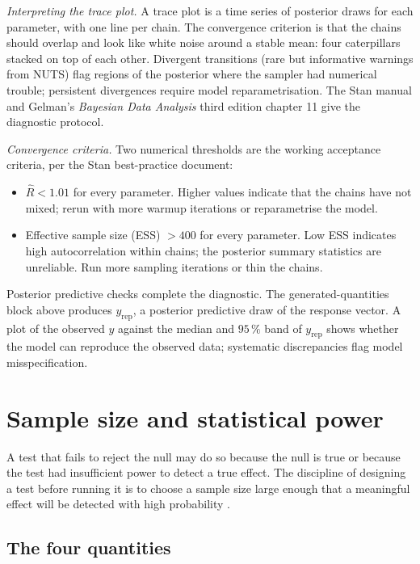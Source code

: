 \textit{Interpreting the trace plot.} A trace plot is a time
series of posterior draws for each parameter, with one line per
chain. The convergence criterion is that the chains should
overlap and look like white noise around a stable mean: four
caterpillars stacked on top of each other. Divergent transitions
(rare but informative warnings from NUTS) flag regions of the
posterior where the sampler had numerical trouble; persistent
divergences require model reparametrisation. The Stan manual
\cite{text:ch08t3b-stan-manual-2024} and Gelman's \emph{Bayesian
Data Analysis} third edition \cite{text:ch08-gelman-bda3-2013}
chapter 11 give the diagnostic protocol.

\textit{Convergence criteria.} Two numerical thresholds are the
working acceptance criteria, per the Stan best-practice document:

\begin{itemize}[leftmargin=*]
  \item $\hat{R} < 1.01$ for every parameter. Higher values
    indicate that the chains have not mixed; rerun with more
    warmup iterations or reparametrise the model.
  \item Effective sample size (ESS) $> 400$ for every parameter.
    Low ESS indicates high autocorrelation within chains; the
    posterior summary statistics are unreliable. Run more
    sampling iterations or thin the chains.
\end{itemize}

Posterior predictive checks complete the diagnostic. The
generated-quantities block above produces $y_{\text{rep}}$, a
posterior predictive draw of the response vector. A plot of the
observed $y$ against the median and $95 \,\%$ band of
$y_{\text{rep}}$ shows whether the model can reproduce the
observed data; systematic discrepancies flag model misspecification.

\section{Sample size and statistical power}

A test that fails to reject the null may do so because the null is
true or because the test had insufficient power to detect a true
effect. The discipline of designing a test before running it is to
choose a sample size large enough that a meaningful effect will be
detected with high probability \cite[ch.~14]{text:devore2015}.

\subsection{The four quantities}

